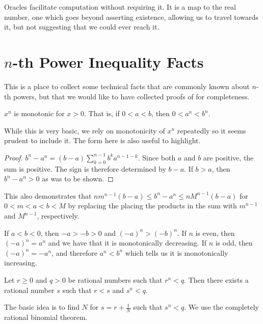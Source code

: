 \documentclass[12pt]{article}
\begin{document}
Oracles facilitate computation without requiring it. It is a map to the real number, one which goes beyond asserting existence, allowing us to travel towards it, but not suggesting that we could ever reach it. 

\appendix

\section{\texorpdfstring{$n$}{n}-th Power Inequality Facts}\label{app:A}

This is a place to collect some technical facts that are commonly known about $n$-th powers, but that we would like to have collected proofs of for completeness.

\begin{lemma}
$x^n$ is monotonic for $x>0$. That is, if $0 < a < b$, then $0 < a^n<b^n$.
\end{lemma}

While this is very basic, we rely on monotonicity of $x^n$ repeatedly so it seems prudent to include it. The form here is also useful to highlight. 

\begin{proof}
$b^n-a^n= (b-a)\sum_{k=0}^{n-1} b^k a^{n-1-k}$. Since both $a$ and $b$ are positive, the sum is positive. The sign is therefore determined by $b-a$. If $b>a$, then $b^n-a^n > 0$ as was to be shown. 
\end{proof}

This also demonstrates that $ n m^{n-1} (b-a) \leq  b^n -a^n \leq n M^{n-1} (b-a)$ for $0 < m < a< b< M$ by replacing the placing the products in the sum with $m^{n-1}$ and $M^{n-1}$, respectively. 

If $ a< b< 0$, then $-a > -b > 0$ and $(-a)^n > (-b)^n$. If $n$ is even, then $(-a)^n = a^n$ and we have that it is monotonically decreasing. If $n$ is odd, then $(-a)^n = -a^n$, and therefore $a^n < b^n$ which tells us it is monotonically increasing. 

\begin{lemma}\label{app:lesser}
Let $r \geq 0 $ and $q > 0$ be rational numbers such that $r^n < q$. Then there exists a rational number $s$ such that $r < s$ and $s^n < q$.
\end{lemma}

The basic idea is to find $N$ for $s = r + \tfrac{1}{N}$ such that $s^n < q$. We use the completely rational binomial theorem.  
\end{document}
